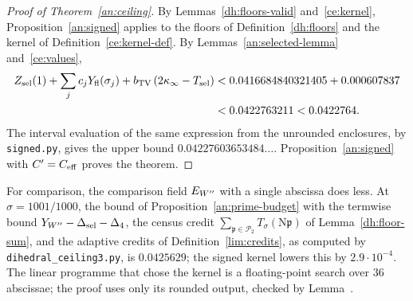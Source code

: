 \begin{proof}[Proof of Theorem~\ref{an:ceiling}]
By Lemmas~\ref{dh:floors-valid} and~\ref{ce:kernel}, Proposition~\ref{an:signed}
applies to the floors of Definition~\ref{dh:floors} and the kernel of
Definition~\ref{ce:kernel-def}. By Lemmas~\ref{an:selected-lemma}
and~\ref{ce:values},
\begin{align*}
 Z_{\rm sel}(1)+\sum_jc_jY_{\rm fl}(\sigma_j)+b_{\rm TV}\,(2\kappa_\infty-T_{\rm sel})
 &<0.0416684840321405+0.000607837\\
 &<0.0422763211<0.0422764.
\end{align*}
The interval evaluation of the same expression from the unrounded
enclosures, by \texttt{signed.py}, gives the upper bound
$0.04227603653484\ldots$. Proposition~\ref{an:signed} with $C'=C_{\rm eff}$
proves the theorem.
\end{proof}

\begin{remark}\label{ce:comparison}
For comparison, the comparison field $E_{W''}$ with a single abscissa does less.
At $\sigma=1001/1000$, the bound of Proposition~\ref{an:prime-budget} with
the termwise bound $Y_{W''}-\Delta_{\rm sel}-\Delta_4$, the census credit
$\sum_{\mathfrak p\in\mathcal P_2}T_\sigma(\mathrm N\mathfrak p)$ of
Lemma~\ref{dh:floor-sum}, and the adaptive credits of
Definition~\ref{lim:credits}, as computed by \texttt{dihedral\_ceiling3.py},
is $0.0425629$; the signed kernel lowers this by $2.9\cdot10^{-4}$. The
linear programme that chose the kernel is a floating-point search over $36$
abscissae; the proof uses only its rounded output, checked by
Lemma~.
\end{remark}

